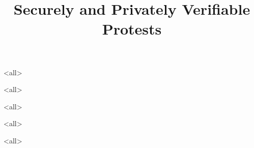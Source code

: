 \title{%
  Securely and Privately Verifiable Protests
}

\maketitle

\mode*

\begin{abstract}
  
\end{abstract}

\clearpage
\tableofcontents
\clearpage

\mode<all>


\mode<all>

\mode<all>


%

\mode<all>

\mode<all>




\begin{frame}[allowframebreaks]
  \printbibliography{}
\end{frame}
